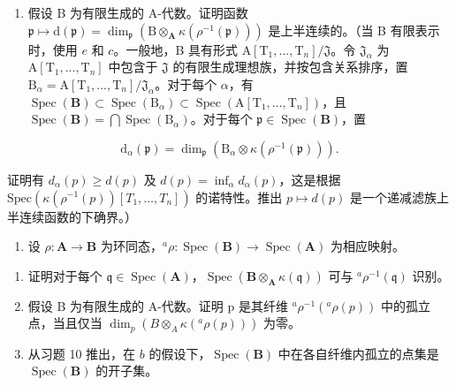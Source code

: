 \begin{enumerate}
\def\labelenumi{\alph{enumi})}
\setcounter{enumi}{5}
\tightlist
\item
  假设 B 为有限生成的 A-代数。证明函数 \(\mathfrak{p} \mapsto \mathrm{d}(\mathfrak{p}) = \dim_{\mathfrak{p}} (\mathrm{B} \otimes_{\mathbf{A}} \kappa(\rho^{-1}(\mathfrak{p})))\) 是上半连续的。（当 B 有限表示时，使用 \(e\) 和 \(c\)。一般地，B 具有形式 \(\mathrm{A}[\mathrm{T}_1, ..., \mathrm{T}_n]/\mathfrak{J}\)。令 \(\mathfrak{J}_{\alpha}\) 为 \(\mathrm{A}[\mathrm{T}_1, ..., \mathrm{T}_n]\) 中包含于 \(\mathfrak{J}\) 的有限生成理想族，并按包含关系排序，置 \(\mathrm{B}_{\alpha} = \mathrm{A}[\mathrm{T}_1, ..., \mathrm{T}_n]/\mathfrak{J}_{\alpha}\)。对于每个 \(\alpha\)，有 \(\operatorname{Spec}(\mathbf{B}) \subset \operatorname{Spec}(\mathrm{B}_{\alpha}) \subset \operatorname{Spec}(\mathrm{A}[\mathrm{T}_1, ..., \mathrm{T}_n])\)，且 \(\operatorname{Spec}(\mathbf{B}) = \bigcap \operatorname{Spec}(\mathrm{B}_{\alpha})\)。对于每个 \(\mathfrak{p} \in \operatorname{Spec}(\mathbf{B})\)，置
\end{enumerate}

\[
\mathrm{d} _ {\alpha} (\mathfrak {p}) = \dim_ {\mathfrak {p}} \left(\mathrm{B} _ {\alpha} \otimes \kappa \left(\rho^ {- 1} (\mathfrak {p})\right)\right).
\]

  证明有 \(d_{\alpha}(p) \geqslant d(p)\) 及 \(d(p) = \inf_{\alpha} d_{\alpha}(p)\)，这是根据 \(\text{Spec}(\kappa(\rho^{-1}(p))[T_1, \ldots, T_n])\) 的诺特性。推出 \(p \mapsto d(p)\) 是一个递减滤族上半连续函数的下确界。）

\begin{enumerate}
\def\labelenumi{\arabic{enumi})}
\setcounter{enumi}{10}
\tightlist
\item
  设 \(\rho: \mathbf{A} \to \mathbf{B}\) 为环同态，\(^a\rho: \operatorname{Spec}(\mathbf{B}) \to \operatorname{Spec}(\mathbf{A})\) 为相应映射。
\end{enumerate}

\begin{enumerate}
\def\labelenumi{\alph{enumi})}
\item
  证明对于每个 \(\mathfrak{q} \in \operatorname{Spec}(\mathbf{A})\)，\(\operatorname{Spec}(\mathbf{B} \otimes_{\mathbf{A}} \kappa(\mathfrak{q}))\) 可与 \(^a\rho^{-1}(\mathfrak{q})\) 识别。
\item
  假设 B 为有限生成的 A-代数。证明 p 是其纤维 \(^a\rho^{-1}(^a\rho(p))\) 中的孤立点，当且仅当 \(\dim_p(B \otimes_A \kappa(^a\rho(p)))\) 为零。
\item
  从习题 10 推出，在 \(b\) 的假设下，\(\operatorname{Spec}(\mathbf{B})\) 中在各自纤维内孤立的点集是 \(\operatorname{Spec}(\mathbf{B})\) 的开子集。
\end{enumerate}

